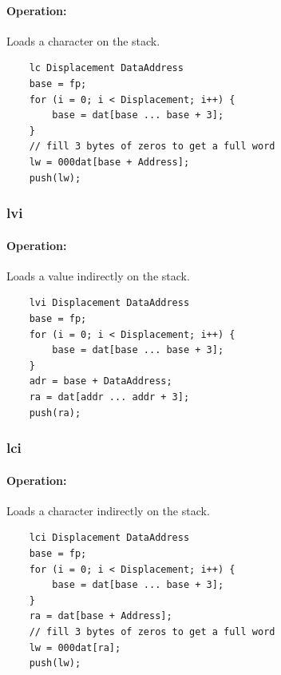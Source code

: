 \paragraph{Operation:}
Loads a character on the stack.

	\begin{lstlisting}
	lc Displacement DataAddress
	base = fp;
	for (i = 0; i < Displacement; i++) {
		base = dat[base ... base + 3];
	}
	// fill 3 bytes of zeros to get a full word
	lw = 000dat[base + Address];
	push(lw);
	\end{lstlisting}

\subsubsection{lvi}

\paragraph{Operation:}
Loads a value indirectly on the stack.

	\begin{lstlisting}
	lvi Displacement DataAddress
	base = fp;
	for (i = 0; i < Displacement; i++) {
		base = dat[base ... base + 3];
	}
	adr = base + DataAddress;
	ra = dat[addr ... addr + 3];
	push(ra);
	\end{lstlisting}

\subsubsection{lci}

\paragraph{Operation:}
Loads a character indirectly on the stack.

	\begin{lstlisting}
	lci Displacement DataAddress
	base = fp;
	for (i = 0; i < Displacement; i++) {
		base = dat[base ... base + 3];
	}
	ra = dat[base + Address];
	// fill 3 bytes of zeros to get a full word
	lw = 000dat[ra];
	push(lw);
	\end{lstlisting}

